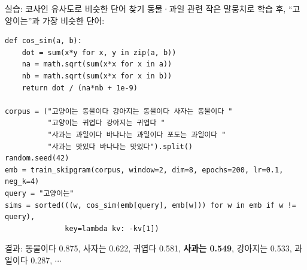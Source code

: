 \documentclass[aspectratio=169,11pt]{beamer}
\begin{document}

\begin{frame}[fragile]{실습: 코사인 유사도로 비슷한 단어 찾기}
  동물·과일 관련 작은 말뭉치로 학습 후, ``고양이는''과 가장 비슷한
  단어:
\begin{lstlisting}
def cos_sim(a, b):
    dot = sum(x*y for x, y in zip(a, b))
    na = math.sqrt(sum(x*x for x in a))
    nb = math.sqrt(sum(x*x for x in b))
    return dot / (na*nb + 1e-9)

corpus = ("고양이는 동물이다 강아지는 동물이다 사자는 동물이다 "
          "고양이는 귀엽다 강아지는 귀엽다 "
          "사과는 과일이다 바나나는 과일이다 포도는 과일이다 "
          "사과는 맛있다 바나나는 맛있다").split()
random.seed(42)
emb = train_skipgram(corpus, window=2, dim=8, epochs=200, lr=0.1, neg_k=4)
query = "고양이는"
sims = sorted(((w, cos_sim(emb[query], emb[w])) for w in emb if w != query),
              key=lambda kv: -kv[1])
\end{lstlisting}
  {\footnotesize 결과: 동물이다 0.875, 사자는 0.622, 귀엽다 0.581,
  \textbf{사과는 0.549}, 강아지는 0.533, 과일이다 0.287, $\cdots$}
\end{frame}
\end{document}

